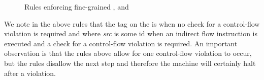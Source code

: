 \begin{figure}[!htpb]
\medskip

\medskip

\medskip

\medskip

\medskip

\caption{Rules enforcing fine-grained \CFI, \NXDname and \NWC}
\end{figure}

We note in the above rules that the tag on the \PCname is \DATAname when
no check for a control-flow violation is required and  where
\textit{src} is some id when an indirect flow instruction is executed and a
check for a control-flow violation is required. An important observation is that
the rules above allow for one control-flow violation to occur, but the rules
disallow the next step and therefore the machine will certainly halt after a
violation.






